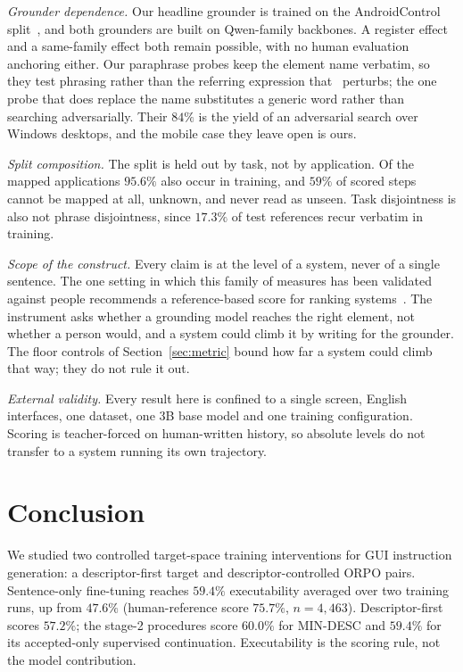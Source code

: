 \documentclass[conference]{IEEEtran}
\begin{document}
\emph{Grounder dependence.} Our headline grounder is trained on the AndroidControl
split~\cite{uground}, and both grounders are built on Qwen-family backbones. A register effect
and a same-family effect both remain possible, with no human evaluation anchoring either.
Our paraphrase probes keep the element name verbatim, so they test phrasing rather than the
referring expression that~\cite{groundersunderstand} perturbs; the one probe that does replace
the name substitutes a generic word rather than searching adversarially. Their $84\%$ is the yield of an adversarial search over
Windows desktops, and the mobile case they leave open is ours.

\emph{Split composition.} The split is held out by task, not by application. Of the mapped
applications $95.6\%$ also occur in training, and $59\%$ of scored steps cannot be mapped at all,
unknown, and never read as unseen. Task disjointness is also not phrase
disjointness, since $17.3\%$ of test references recur verbatim in training.

\emph{Scope of the construct.} Every claim is at the level of a system, never of a single
sentence. The one setting in which this family of measures has been validated against people
recommends a reference-based score for ranking systems~\cite{zhao2021}. The instrument asks
whether a grounding model reaches the right element, not whether a person would, and a system
could climb it by writing for the grounder. The floor controls of Section~\ref{sec:metric} bound how far
a system could climb that way; they do not rule it out.

\emph{External validity.} Every result here is confined to a single screen, English interfaces,
one dataset, one 3B base model and one training configuration. Scoring is teacher-forced on
human-written history, so absolute levels do not transfer to a system running its own trajectory.

\section{Conclusion}

We studied two controlled target-space training interventions for GUI instruction
generation: a descriptor-first target and descriptor-controlled ORPO pairs. Sentence-only
fine-tuning reaches $59.4\%$ executability averaged over two training runs, up from $47.6\%$
(human-reference score $75.7\%$, $n=4{,}463$). Descriptor-first scores $57.2\%$; the stage-2
procedures score $60.0\%$ for MIN-DESC and $59.4\%$ for its accepted-only supervised
continuation. Executability is the scoring rule, not the model contribution.
\end{document}
